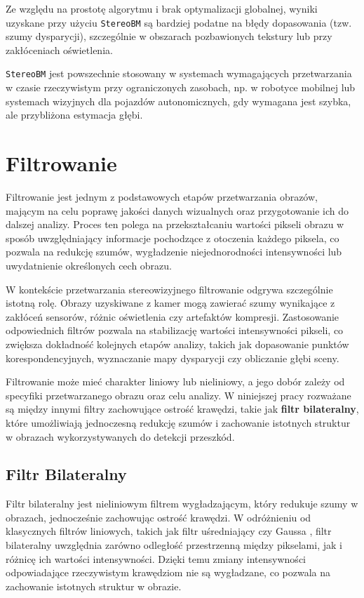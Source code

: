 \documentclass[magisterska]{pracadypl}
\begin{document}
Ze względu na prostotę algorytmu i brak optymalizacji globalnej, wyniki uzyskane przy użyciu \texttt{StereoBM} są bardziej podatne na błędy dopasowania (tzw. szumy dysparycji), szczególnie w obszarach pozbawionych tekstury lub przy zakłóceniach oświetlenia.

\texttt{StereoBM} jest powszechnie stosowany w systemach wymagających przetwarzania w czasie rzeczywistym przy ograniczonych zasobach, np. w robotyce mobilnej lub systemach wizyjnych dla pojazdów autonomicznych, gdy wymagana jest szybka, ale przybliżona estymacja głębi.

\section{Filtrowanie}

Filtrowanie jest jednym z podstawowych etapów przetwarzania obrazów, mającym na celu poprawę jakości danych wizualnych oraz przygotowanie ich do dalszej analizy. Proces ten polega na przekształcaniu wartości pikseli obrazu w sposób uwzględniający informacje pochodzące z otoczenia każdego piksela, co pozwala na redukcję szumów, wygładzenie niejednorodności intensywności lub uwydatnienie określonych cech obrazu.  

W kontekście przetwarzania stereowizyjnego filtrowanie odgrywa szczególnie istotną rolę. Obrazy uzyskiwane z kamer mogą zawierać szumy wynikające z zakłóceń sensorów, różnic oświetlenia czy artefaktów kompresji. Zastosowanie odpowiednich filtrów pozwala na stabilizację wartości intensywności pikseli, co zwiększa dokładność kolejnych etapów analizy, takich jak dopasowanie punktów korespondencyjnych, wyznaczanie mapy dysparycji czy obliczanie głębi sceny.  

Filtrowanie może mieć charakter liniowy lub nieliniowy, a jego dobór zależy od specyfiki przetwarzanego obrazu oraz celu analizy. W niniejszej pracy rozważane są między innymi filtry zachowujące ostrość krawędzi, takie jak \textbf{filtr bilateralny}, które umożliwiają jednoczesną redukcję szumów i zachowanie istotnych struktur w obrazach wykorzystywanych do detekcji przeszkód.

\subsection{Filtr Bilateralny}

Filtr bilateralny \cite{bilat} jest nieliniowym filtrem wygładzającym, który redukuje szumy w obrazach, jednocześnie zachowując ostrość krawędzi. W odróżnieniu od klasycznych filtrów liniowych, takich jak filtr uśredniający czy Gaussa \cite{gauss}, filtr bilateralny uwzględnia zarówno odległość przestrzenną między pikselami, jak i różnicę ich wartości intensywności. Dzięki temu zmiany intensywności odpowiadające rzeczywistym krawędziom nie są wygładzane, co pozwala na zachowanie istotnych struktur w obrazie.
\end{document}
